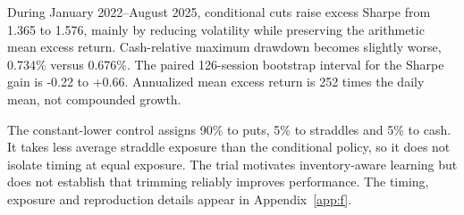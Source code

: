 During January 2022--August 2025, conditional cuts raise excess Sharpe from 1.365 to 1.576, mainly by reducing volatility while preserving the arithmetic mean excess return. Cash-relative maximum drawdown becomes slightly worse, 0.734\% versus 0.676\%. The paired 126-session bootstrap interval for the Sharpe gain is -0.22 to +0.66. Annualized mean excess return is 252 times the daily mean, not compounded growth.


The constant-lower control assigns 90\% to puts, 5\% to straddles and 5\% to cash. It takes less average straddle exposure than the conditional policy, so it does not isolate timing at equal exposure. The trial motivates inventory-aware learning but does not establish that trimming reliably improves performance. The timing, exposure and reproduction details appear in Appendix~\ref{app:f}.


\FloatBarrier
